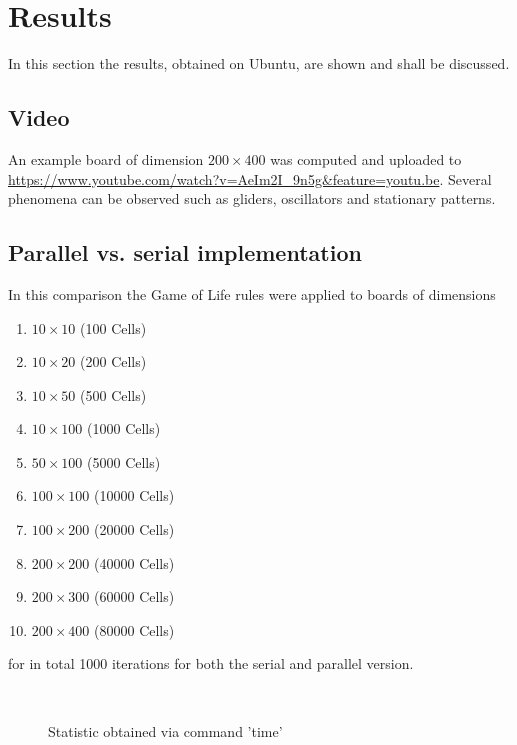 \section{Results}\label{sec:results}
In this section the results, obtained on Ubuntu, are shown and shall be discussed.

\subsection{Video}
An example board of dimension $200\times 400$ was computed and uploaded to \url{https://www.youtube.com/watch?v=AeIm2I_9n5g&feature=youtu.be}. Several phenomena can be observed such as gliders, oscillators and stationary patterns.

\subsection{Parallel vs. serial implementation}
In this comparison the Game of Life rules were applied to boards of dimensions
\begin{enumerate}
	\item $10\times10$ (100 Cells)
	\item $10\times20$ (200 Cells)
	\item $10\times50$ (500 Cells)
	\item $10\times100$ (\num{1000} Cells)
	\item $50\times100$ (\num{5000} Cells)
	\item $100\times100$ (\num{10000} Cells)
	\item $100\times200$ (\num{20000} Cells)
	\item $200\times200$ (\num{40000} Cells)
	\item $200\times300$ (\num{60000} Cells)
	\item $200\times400$ (\num{80000} Cells)
\end{enumerate}
for in total 1000 iterations for both the serial and parallel version. 

\begin{figure}\centering
	 \\
	\caption{Statistic obtained via command 'time'}
	\label{fig:CommandLineResults}
\end{figure}

